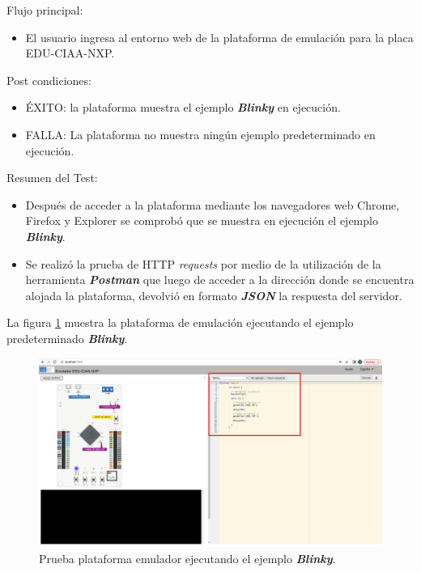Flujo principal:
\begin{itemize}
	\item El usuario ingresa al entorno web de la plataforma de emulación para la placa EDU-CIAA-NXP.
\end{itemize}
Post condiciones:
\begin{itemize}
	\item ÉXITO: la plataforma muestra el ejemplo \textit{\textbf{Blinky}} en ejecución.
	\item FALLA: La plataforma no muestra ningún ejemplo predeterminado en ejecución.
\end{itemize}

Resumen del Test:
\begin{itemize}
	\item Después de acceder a la plataforma mediante los navegadores web Chrome, Firefox y Explorer se comprobó que se muestra en ejecución el ejemplo \textit{\textbf{Blinky}}.
	\item Se realizó la prueba de HTTP \textit{requests} por medio de la utilización de la herramienta \textit{\textbf{Postman}} que luego de acceder a la dirección donde se encuentra alojada la plataforma, devolvió en formato \textit{\textbf{JSON}} la respuesta del servidor.
\end{itemize}


La figura \ref{fig:PlataformaEmuladorBlinky} muestra la plataforma de emulación ejecutando el ejemplo predeterminado \textit{\textbf{Blinky}}.

\begin{figure}[ht]
	\centering
	\includegraphics[scale=.21]{./Figures/PlataformaEmuladorBlinky.png}
	\caption{Prueba plataforma emulador ejecutando el ejemplo \textit{\textbf{Blinky}}.}
	\label{fig:PlataformaEmuladorBlinky}
\end{figure}

